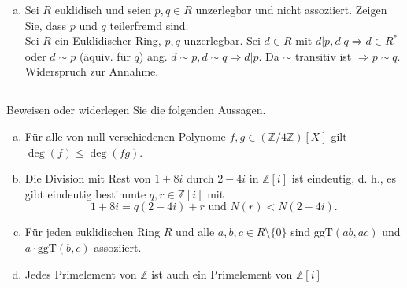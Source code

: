 \documentclass{article}
\newcommand{\Z}{\mathbb{Z}}
\newcommand{\ggT}{\text{ggT}}
\begin{document}
\begin{enumerate}[(a)]
\begin{itemize}
                Sei $p|q\Rightarrow
                \underset{a\in R}\exists q=ap
                \Rightarrow a\in R^*\lor p\in R^*
                \Rightarrow a\in R^*$
                \begin{equation*}
                    q=ap\Leftrightarrow a^{-1}q=p
                    \Rightarrow q|p\Rightarrow p\sim q
                \end{equation*}
            \item ``$\Leftarrow$''\\
                Seien $p\sim q\Rightarrow p|q$
        \end{itemize}
    \item
        \color{blue}
        Sei $R$ euklidisch und seien $p,q\in R$
        unzerlegbar und nicht assoziiert. Zeigen Sie, dass
        $p$ und $q$ teilerfremd sind.\\
        \color{black}
        Sei $R$ ein Euklidischer Ring, $p,q$ unzerlegbar.
        Sei $d\in R$ mit $d|p,d|q\Rightarrow d\in R^*$ oder
        $d\sim p$ (äquiv. für $q$) ang. $d\sim p,d\sim
        q\Rightarrow d|p$. Da $\sim$ transitiv ist
        $\Rightarrow p\sim q$. Widerspruch zur Annahme.
\end{enumerate}
\subsection{}
\color{blue}
Beweisen oder widerlegen Sie die folgenden Aussagen.
\color{black}
\begin{enumerate}[(a)]
    \item
        \color{blue}
        Für alle von null verschiedenen Polynome $f,g\in
        (\Z/4\Z)[X]$ gilt $\deg(f)\leq\deg(fg)$.\\
        \color{black}
    \item
        \color{blue}
        Die Division mit Rest von $1+8i$ durch $2-4i$ in
        $\Z[i]$ ist eindeutig, d. h., es gibt eindeutig
        bestimmte $q,r\in\Z[i]$ mit
        \begin{equation*}
        1+8i=q(2-4i)+r\text{ und }N(r)<N(2-4i).
        \end{equation*}
        \color{black}
    \item
        \color{blue}
        Für jeden euklidischen Ring $R$ und alle $a,b,c\in
        R\setminus\{0\}$ sind $\ggT(ab,ac)$ und
        $a\cdot\ggT(b,c)$ assoziiert.
        \color{black}
    \item
        \color{blue}
        Jedes Primelement von $\Z$ ist auch ein Primelement
        von $\Z[i]$
        \color{black}
\end{enumerate}
\end{document}
